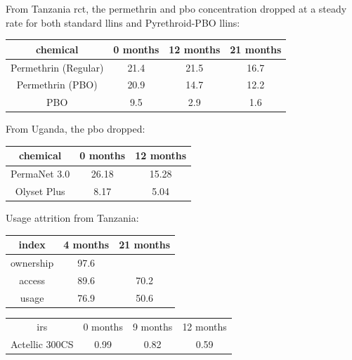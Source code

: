 \documentclass[a4paper, 12pt, twoside]{article}
\begin{document}
From Tanzania\cite{Protopopoff2018} \gls{rct}, the permethrin and \gls{pbo} concentration dropped at a steady rate for both standard \gls{llins} and Pyrethroid-PBO \gls{llins}:

\begin{center}
	\begin{tabular}{cccc}
		\toprule
		chemical             & 0 months & 12 months & 21 months \\
		\midrule
		Permethrin (Regular) & 21.4     & 21.5      & 16.7      \\
		Permethrin (PBO)     & 20.9     & 14.7      & 12.2      \\
		PBO                  & 9.5      & 2.9       & 1.6       \\
		\bottomrule
	\end{tabular}
\end{center}

From Uganda\cite{Staedke2020}, the \gls{pbo} dropped:
\begin{center}
	\begin{tabular}{c c c}
		\toprule
		chemical     & 0 months & 12 months \\
		\midrule
		PermaNet 3.0 & 26.18    & 15.28     \\
		Olyset Plus  & 8.17     & 5.04      \\
		\bottomrule
	\end{tabular}
\end{center}

Usage attrition from Tanzania\cite{Protopopoff2018}:

\begin{center}
	\begin{tabular}{c c c}
		\toprule
		index     & 4 months & 21 months \\
		\midrule
		ownership & 97.6     &           \\
		access    & 89.6     & 70.2      \\
		usage     & 76.9     & 50.6      \\
		\bottomrule
	\end{tabular}
\end{center}

\begin{center}
	\begin{tabular}{c c c c}
		\gls{irs}      & 0 months & 9 months & 12 months \\
		Actellic 300CS & 0.99     & 0.82     & 0.59      \\
	\end{tabular}
\end{center}
\end{document}
